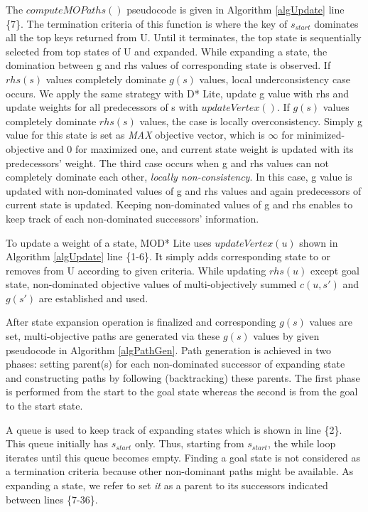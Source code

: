 \documentclass[10pt,journal]{IEEEtran}
\begin{document}
The $computeMOPaths()$ pseudocode is given in Algorithm \ref{algUpdate} line \{7\}. The termination criteria of this function is where the key of $s_{start}$ dominates all the top keys returned from U. Until it terminates, the top state is sequentially selected from top states of U and expanded. While expanding a state, the domination between g and rhs values of corresponding state is observed. If $rhs(s)$ values completely dominate $g(s)$ values, local underconsistency case occurs. We apply the same strategy with D* Lite, update g value with rhs and update weights for all predecessors of s with $updateVertex()$. If $g(s)$ values completely dominate $rhs(s)$ values, the case is locally overconsistency. Simply g value for this state is set as \textit{MAX} objective vector, which is $\infty$ for minimized-objective and $0$ for maximized one, and current state weight is updated with its predecessors' weight. The third case occurs when g and rhs values can not completely dominate each other, \textit{locally non-consistency}. In this case, g value is updated with non-dominated values of g and rhs values and again predecessors of current state is updated. Keeping non-dominated values of g and rhs enables to keep track of each non-dominated successors' information.

To update a weight of a state, MOD* Lite uses $updateVertex(u)$ shown in Algorithm \ref{algUpdate} line \{1-6\}. It simply adds corresponding state to or removes from U according to given criteria. While updating $rhs(u)$ except goal state, non-dominated objective values of multi-objectively summed $c(u,s')$ and $g(s')$ are established and used.

After state expansion operation is finalized and corresponding $g(s)$ values are set, multi-objective paths are generated via these $g(s)$ values by given pseudocode in Algorithm \ref{algPathGen}. Path generation is achieved in two phases: setting parent(s) for each non-dominated successor of expanding state and constructing paths by following (backtracking) these parents. The first phase is performed from the start to the goal state whereas the second is from the goal to the start state. 

A queue is used to keep track of expanding states which is shown in line \{2\}. This queue initially has $s_{start}$ only. Thus, starting from $s_{start}$, the while loop iterates until this queue becomes empty. Finding a goal state is not considered as a termination criteria because other non-dominant paths might be available. As expanding a state, we refer to set \textit{it} as a parent to its successors indicated between lines \{7-36\}.
\end{document}
